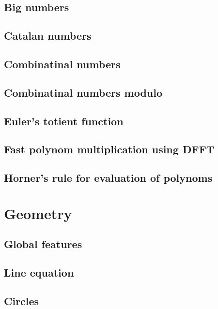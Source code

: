 \documentclass[a4paper]{article}
\begin{document}
    \subsection{Big numbers}
        
    \subsection{Catalan numbers}
        
    \subsection{Combinatinal numbers}
        
    \subsection{Combinatinal numbers modulo}
        
    \subsection{Euler's totient function}
        
    \subsection{Fast polynom multiplication using DFFT}
        
    \subsection{Horner's rule for evaluation of polynoms}
        

\section{Geometry}
    \subsection{Global features}
        
    \subsection{Line equation}
        
    \subsection{Circles}
\end{document}
